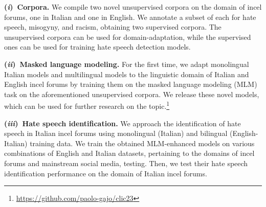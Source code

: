 \documentclass[11pt]{article}
\newcommand{\Ni}{({\em i})~}
\newcommand{\Nii}{({\em ii})~}
\newcommand{\Niii}{({\em iii})~}
\newcommand{\mbert}{\mbox{mBERT$_{base}$}}
\newcommand{\umbert}{\mbox{UmBERTo}}
\newcommand{\albert}{\mbox{AlBERTo}}
\newcommand{\enforum}{\textit{Incels.is}}
\newcommand{\itforum}{\textit{Il forum dei brutti}}
\begin{document}
\vspace*{1mm}\noindent\textbf{\Ni Corpora.} We compile two novel unsupervised corpora on the domain of incel forums, one in Italian and one in English. We annotate a subset of each for hate speech, misogyny, and racism, obtaining two supervised corpora. The unsupervised corpora can be used for domain-adaptation, while the supervised ones can be used for training hate speech detection models.

\vspace*{1mm}\noindent\textbf{\Nii Masked language modeling.} For the first time, we adapt monolingual Italian models and multilingual models to the linguistic domain of Italian and English incel forums by training them on the masked language modeling (MLM) task on the aforementioned unsupervised corpora. We release these novel models, which can be used for further research on the topic.\footnote{\url{https://github.com/paolo-gajo/clic23}}

\vspace*{1mm}\noindent\textbf{\Niii Hate speech identification.} We approach the identification of hate speech in Italian incel forums using monolingual (Italian) and bilingual (English-Italian) training data. We train the obtained MLM-enhanced models on various combinations of English and Italian datasets, pertaining to the domains of incel forums and mainstream social media, testing. Then, we test their hate speech identification performance on the domain of Italian incel forums.



\end{document}
